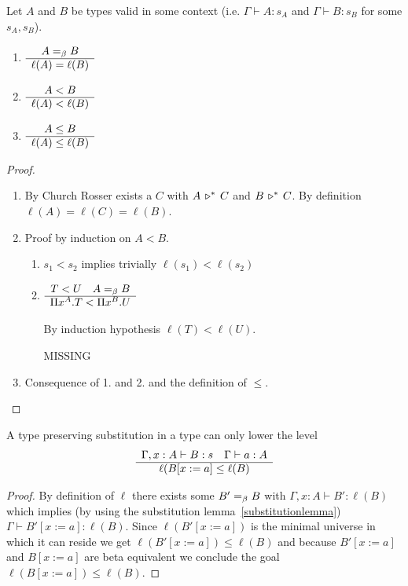 \begin{lemma}
  Let $A$ and $B$ be types valid in some context (i.e. $\Gamma \vdash A : s_A$
  and $\Gamma \vdash B : s_B$ for some $s_A,s_B$).
  \begin{enumerate}
  \item $\begin{array}{c} A =_\beta B \\ \hline \ell(A) = \ell(B)\end{array}$

  \item $\begin{array}{c} A < B \\ \hline \ell(A) < \ell(B)\end{array}$

  \item $\begin{array}{c} A \le B \\ \hline \ell(A) \le \ell(B)\end{array}$
  \end{enumerate}

  \begin{proof} \
    \begin{enumerate}
    \item
      By Church Rosser exists a $C$ with $A \,\triangleright^*\, C$ and  $B \,\triangleright^*\,
      C$. By definition $\ell(A) = \ell(C) = \ell(B)$.

    \item Proof by induction on $A < B$.
    \begin{enumerate}
    \item $s_1 < s_2$ implies trivially $\ell(s_1) < \ell(s_2)$

    \item $\begin{array}{c} T < U \quad A =_\beta B \\ \hline \Pi x^A.T < \Pi x^B.U\end{array}$

      By induction hypothesis $\ell(T) < \ell(U)$.

       MISSING
    \end{enumerate}

    \item
      Consequence of 1. and 2. and the definition of $\le$.
    \end{enumerate}
  \end{proof}
\end{lemma}



\begin{lemma}
  A type preserving substitution in a type can only lower the level
  $$
  \begin{array}{c} \Gamma,x:A \vdash B:s \quad \Gamma \vdash a:A \\ \hline \ell(B[x:=a] \le \ell(B)\end{array}
  $$
  \begin{proof}

    By definition of $\ell$ there exists some $B' =_\beta B$ with
    $\Gamma,x:A \vdash B': \ell(B)$
    which implies (by using the substitution lemma~\ref{substitutionlemma})
    $\Gamma \vdash B'[x:=a] : \ell(B)$.
    Since $\ell(B'[x:=a])$ is the minimal universe in which it can reside we
    get  $\ell(B'[x:=a]) \le \ell(B)$ and because $B'[x:=a]$ and $B[x:=a]$ are
    beta equivalent we conclude the goal $\ell(B[x:=a]) \le \ell(B)$.

  \end{proof}
\end{lemma}


